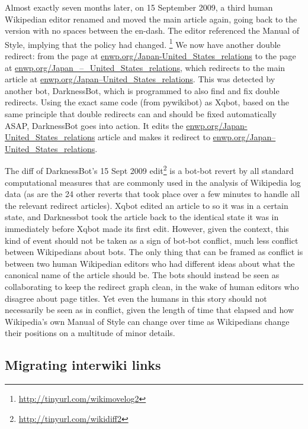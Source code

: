 \documentclass[format=acmsmall, review=false, screen=true]{acmart}%
\begin{document}
Almost exactly seven months later, on 15 September 2009, a third human Wikipedian editor renamed and moved the main article again, going back to the version with no spaces between the en-dash. The editor referenced the Manual of Style, implying that the policy had changed. \footnote{ \url{http://tinyurl.com/wikimovelog2} } We now have another double redirect: from the page at \url{enwp.org/Japan-United\_States\_relations} to the page at \href{http://enwp.org/Japan\_–\_United\_States\_relations}{enwp.org/Japan\_–\_United\_States\_relations}, which redirects to the main article at \href{http://enwp.org/Japan–United\_States\_relations}{enwp.org/Japan–United\_States\_relations}. This was detected by another bot, DarknessBot, which is programmed to also find and fix double redirects. Using the exact same code (from pywikibot) as Xqbot, based on the same principle that double redirects can and should be fixed automatically ASAP, DarknessBot goes into action. It edits the \url{enwp.org/Japan-United\_States\_relations} article and makes it redirect to \href{http://enwp.org/Japan–United\_States\_relations}{enwp.org/Japan–United\_States\_relations}.

The diff of DarknessBot's 15 Sept 2009 edit\footnote{ \url{http://tinyurl.com/wikidiff2} } is a bot-bot revert by all standard computational measures that are commonly used in the analysis of Wikipedia log data (as are the 24 other reverts that took place over a few minutes to handle all the relevant redirect articles). Xqbot edited an article to so it was in a certain state, and Darknessbot took the article back to the identical state it was in immediately before Xqbot made its first edit. However, given the context, this kind of event should not be taken as a sign of bot-bot conflict, much less conflict between Wikipedians about bots. The only thing that can be framed as conflict is between two human Wikipedian editors who had different ideas about what the canonical name of the article should be. The bots should instead be seen as collaborating to keep the redirect graph clean, in the wake of human editors who disagree about page titles. Yet even the humans in this story should not necessarily be seen as in conflict, given the length of time that elapsed and how Wikipedia's own Manual of Style can change over time as Wikipedians change their positions on a multitude of minor details.

\subsection{Migrating interwiki links} \label{s:qualdesc:interwiki}
\end{document}
